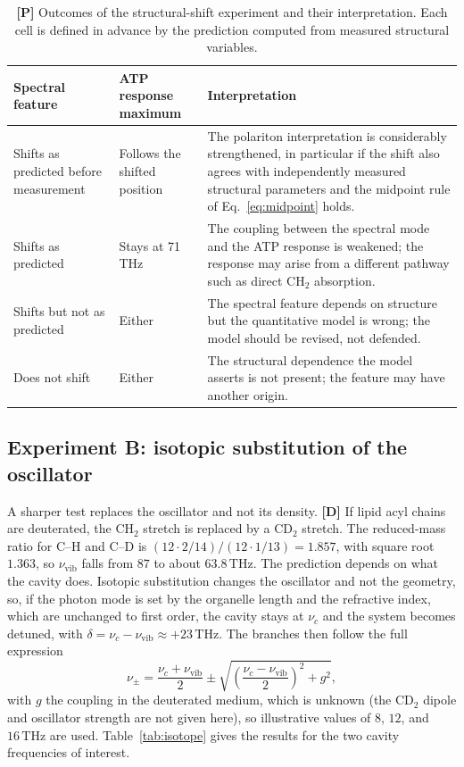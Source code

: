 \documentclass[11pt]{article}
\newcommand{\stD}{\textbf{\textcolor{green!40!black}{[D]}}}
\newcommand{\stP}{\textbf{\textcolor{violet!80!black}{[P]}}}
\newcommand{\thz}{\,\mathrm{THz}}
\theoremstyle{plain}
\theoremstyle{definition}
\theoremstyle{remark}
\begin{document}
\begin{table}[ht]
\centering
\small
\begin{tabularx}{\textwidth}{@{}p{3.1cm}p{3.1cm}X@{}}
\toprule
Spectral feature & ATP response maximum & Interpretation \\
\midrule
Shifts as predicted before measurement & Follows the shifted position & The polariton interpretation is considerably strengthened, in particular if the shift also agrees with independently measured structural parameters and the midpoint rule of Eq.~\eqref{eq:midpoint} holds. \\
Shifts as predicted & Stays at 71\,THz & The coupling between the spectral mode and the ATP response is weakened; the response may arise from a different pathway such as direct CH$_2$ absorption. \\
Shifts but not as predicted & Either & The spectral feature depends on structure but the quantitative model is wrong; the model should be revised, not defended. \\
Does not shift & Either & The structural dependence the model asserts is not present; the feature may have another origin. \\
\bottomrule
\end{tabularx}
\caption{\stP{} Outcomes of the structural-shift experiment and their interpretation. Each cell is defined in advance by the prediction computed from measured structural variables.}
\label{tab:outcomes}
\end{table}

\subsection{Experiment B: isotopic substitution of the oscillator}

A sharper test replaces the oscillator and not its density. \stD{} If lipid acyl chains are deuterated, the CH$_2$ stretch is replaced by a CD$_2$ stretch. The reduced-mass ratio for C--H and C--D is $(12\cdot2/14)/(12\cdot1/13)=1.857$, with square root $1.363$, so $\nu_{\mathrm{vib}}$ falls from $87$ to about $63.8\thz$. The prediction depends on what the cavity does. Isotopic substitution changes the oscillator and not the geometry, so, if the photon mode is set by the organelle length and the refractive index, which are unchanged to first order, the cavity stays at $\nu_c$ and the system becomes detuned, with $\delta=\nu_c-\nu_{\mathrm{vib}}\approx+23\thz$. The branches then follow the full expression
\begin{equation}
\nu_\pm=\frac{\nu_c+\nu_{\mathrm{vib}}}{2}\pm\sqrt{\left(\frac{\nu_c-\nu_{\mathrm{vib}}}{2}\right)^2+g^2},
\label{eq:detuned}
\end{equation}
with $g$ the coupling in the deuterated medium, which is unknown (the CD$_2$ dipole and oscillator strength are not given here), so illustrative values of $8$, $12$, and $16\thz$ are used. Table~\ref{tab:isotope} gives the results for the two cavity frequencies of interest.
\end{document}
